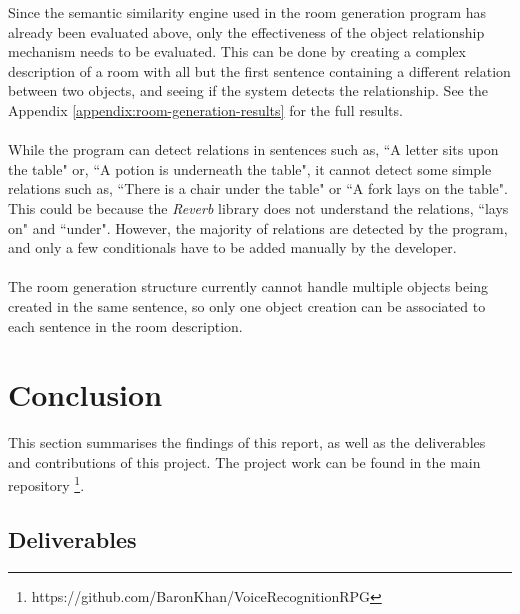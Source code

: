 \documentclass[11pt]{article}
\begin{document}
Since the semantic similarity engine used in the room generation program has already been evaluated above, only the effectiveness of the object relationship mechanism needs to be evaluated. This can be done by creating a complex description of a room with all but the first sentence containing a different relation between two objects, and seeing if the system detects the relationship. See the Appendix \ref{appendix:room-generation-results} for the full results.
\\
\\
While the program can detect relations in sentences such as, ``A letter sits upon the table" or, ``A potion is underneath the table", it cannot detect some simple relations such as, ``There is a chair under the table" or ``A fork lays on the table". This could be because the \textit{Reverb} library does not understand the relations, ``lays on" and ``under". However, the majority of relations are detected by the program, and only a few conditionals have to be added manually by the developer.
\\
\\
The room generation structure currently cannot handle multiple objects being created in the same sentence, so only one object creation can be associated to each sentence in the room description.



\newpage
\section{Conclusion}

This section summarises the findings of this report, as well as the deliverables and contributions of this project. The project work can be found in the main repository \footnote{https://github.com/BaronKhan/VoiceRecognitionRPG}.

\subsection{Deliverables}
\label{section:deliverables}
\end{document}
